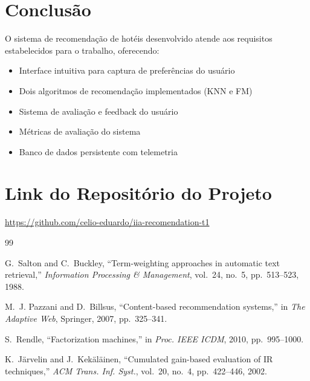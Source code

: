 \documentclass[10pt,twocolumn,letterpaper]{article}
\begin{document}
\section{Conclusão}

O sistema de recomendação de hotéis desenvolvido atende aos requisitos estabelecidos para o trabalho, oferecendo:

\begin{itemize}
    \item Interface intuitiva para captura de preferências do usuário
    \item Dois algoritmos de recomendação implementados (KNN e FM)
    \item Sistema de avaliação e feedback do usuário
    \item Métricas de avaliação do sistema
    \item Banco de dados persistente com telemetria
\end{itemize}

\section{Link do Repositório do Projeto}
\url{https://github.com/celio-eduardo/iia-recomendation-t1}

\begin{thebibliography}{99}

G.~Salton and C.~Buckley,
``Term-weighting approaches in automatic text retrieval,''
\emph{Information Processing \& Management}, vol.~24, no.~5, pp.~513--523, 1988.

M.~J. Pazzani and D.~Billsus,
``Content-based recommendation systems,''
in \emph{The Adaptive Web}, Springer, 2007, pp.~325--341.

S.~Rendle,
``Factorization machines,''
in \emph{Proc. IEEE ICDM}, 2010, pp.~995--1000.

K.~J{\"a}rvelin and J.~Kek{\"a}l{\"a}inen,
``Cumulated gain-based evaluation of IR techniques,''
\emph{ACM Trans. Inf. Syst.}, vol.~20, no.~4, pp.~422--446, 2002.

\end{thebibliography}
\end{document}
